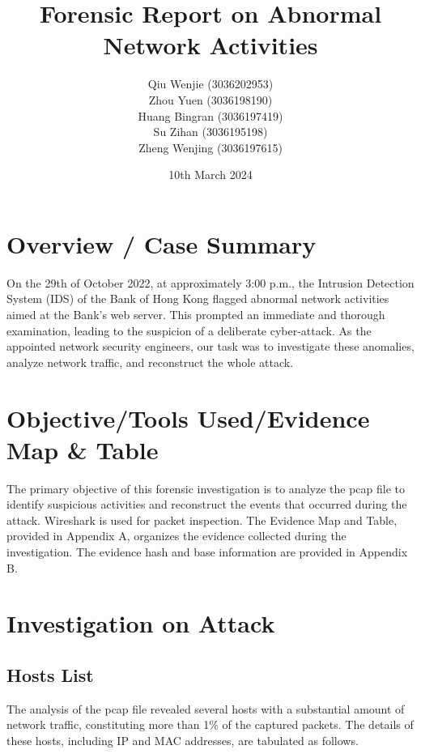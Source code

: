 \documentclass{article}
\title{\fontsize{16pt}{19pt}\selectfont\textbf{Forensic Report on Abnormal Network Activities}}
\author{\fontsize{12pt}{14pt}\selectfont Qiu Wenjie (3036202953) \\ Zhou Yuen (3036198190) \\ Huang Bingran (3036197419) \\ Su Zihan (3036195198) \\ Zheng Wenjing (3036197615)}
\date{\fontsize{12pt}{14pt}\selectfont 10th March 2024}
\begin{document}
    \maketitle

    \section{\fontsize{14pt}{17pt}\selectfont Overview / Case Summary}\label{sec:selectfont-overview-/-case-summary}
    On the 29th of October 2022, at approximately 3:00 p.m.,
    the Intrusion Detection System (IDS) of the Bank of Hong Kong flagged abnormal network activities aimed at the Bank's web server.
    This prompted an immediate and thorough examination,
    leading to the suspicion of a deliberate cyber-attack.
    As the appointed network security engineers, our task was to investigate these anomalies,
    analyze network traffic, and reconstruct the whole attack.

    \section{\fontsize{14pt}{17pt}\selectfont Objective/Tools Used/Evidence Map \& Table}\label{sec:selectfont-objective/tools-used/evidence-map-&-table}
    The primary objective of this forensic investigation is to analyze the pcap file to identify suspicious activities
    and reconstruct the events that occurred during the attack.
    Wireshark is used for packet inspection.
    The Evidence Map and Table, provided in Appendix A, organizes the evidence collected during the investigation.
    The evidence hash and base information are provided in Appendix B.

    \section{\fontsize{14pt}{17pt}\selectfont Investigation on Attack}\label{sec:selectfont-investigation-on-attack}
    \subsection{Hosts List}\label{subsec:hosts-list}
    The analysis of the pcap file revealed several hosts with a substantial amount of network traffic,
    constituting more than 1\% of the captured packets.
    The details of these hosts, including IP and MAC addresses, are tabulated as follows.
\end{document}
